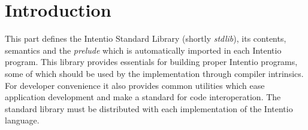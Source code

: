 \chapter{Introduction}

This part defines the Intentio Standard Library (shortly \emph{stdlib}), its contents, semantics and the \emph{prelude} which is automatically imported in each Intentio program. This library provides essentials for building proper Intentio programs, some of which should be used by the implementation through compiler intrinsics. For developer convenience it also provides common utilities which ease application development and make a standard for code interoperation. The standard library must be distributed with each implementation of the Intentio language.
